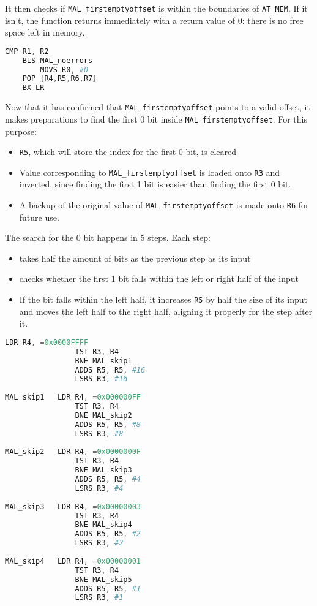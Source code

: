 \documentclass[pdftex,12pt,a4paper]{article}
\begin{document}
It then checks if \verb|MAL_firstemptyoffset| is within the boundaries of \verb|AT_MEM|. If it isn't, the function returns immediately with a return value of 0: there is no free space left in memory.

\begin{lstlisting}[language=Assembler]
        CMP R1, R2
	BLS MAL_noerrors
        MOVS R0, #0
	POP {R4,R5,R6,R7}
	BX LR
\end{lstlisting}

Now that it has confirmed that \verb|MAL_firstemptyoffset| points to a valid offset, it makes preparations to find the first 0 bit inside \verb|MAL_firstemptyoffset|. For this purpose:
\begin{itemize}
    \item \verb|R5|, which will store the index for the first 0 bit, is cleared
    \item Value  corresponding to \verb|MAL_firstemptyoffset| is loaded onto \verb|R3| and inverted, since finding the first 1 bit is easier than finding the first 0 bit.
    \item A backup of the original value of \verb|MAL_firstemptyoffset| is made onto \verb|R6| for future use.
\end{itemize}

The search for the 0 bit happens in 5 steps. Each step:
\begin{itemize}
    \item takes half the amount of bits as the previous step as its input
    \item checks whether the first 1 bit falls within the left or right half of the input
    \item If the bit falls within the left half, it increases \verb|R5| by half the size of its input and moves the left half to the right half, aligning it properly for the step after it.
\end{itemize}

\begin{lstlisting}[language=Assembler]
                LDR R4, =0x0000FFFF
                TST R3, R4
                BNE MAL_skip1
                ADDS R5, R5, #16
                LSRS R3, #16
		
MAL_skip1	LDR R4, =0x000000FF
                TST R3, R4
                BNE MAL_skip2
                ADDS R5, R5, #8
                LSRS R3, #8
		
MAL_skip2	LDR R4, =0x0000000F
                TST R3, R4
                BNE MAL_skip3
                ADDS R5, R5, #4
                LSRS R3, #4
		
MAL_skip3	LDR R4, =0x00000003
            	TST R3, R4
            	BNE MAL_skip4
            	ADDS R5, R5, #2
            	LSRS R3, #2
		
MAL_skip4	LDR R4, =0x00000001
            	TST R3, R4
                BNE MAL_skip5
            	ADDS R5, R5, #1
            	LSRS R3, #1
\end{lstlisting}
\end{document}
